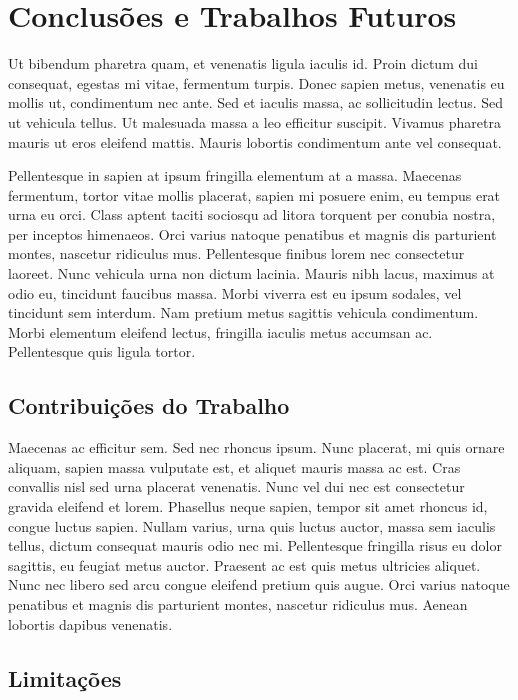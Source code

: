 \chapter{Conclusões e Trabalhos Futuros}
\label{chap:conclusoes-e-trabalhos-futuros}

Ut bibendum pharetra quam, et venenatis ligula iaculis id. Proin dictum dui consequat, egestas mi vitae, fermentum turpis. Donec sapien metus, venenatis eu mollis ut, condimentum nec ante. Sed et iaculis massa, ac sollicitudin lectus. Sed ut vehicula tellus. Ut malesuada massa a leo efficitur suscipit. Vivamus pharetra mauris ut eros eleifend mattis. Mauris lobortis condimentum ante vel consequat.

Pellentesque in sapien at ipsum fringilla elementum at a massa. Maecenas fermentum, tortor vitae mollis placerat, sapien mi posuere enim, eu tempus erat urna eu orci. Class aptent taciti sociosqu ad litora torquent per conubia nostra, per inceptos himenaeos. Orci varius natoque penatibus et magnis dis parturient montes, nascetur ridiculus mus. Pellentesque finibus lorem nec consectetur laoreet. Nunc vehicula urna non dictum lacinia. Mauris nibh lacus, maximus at odio eu, tincidunt faucibus massa. Morbi viverra est eu ipsum sodales, vel tincidunt sem interdum. Nam pretium metus sagittis vehicula condimentum. Morbi elementum eleifend lectus, fringilla iaculis metus accumsan ac. Pellentesque quis ligula tortor.

\section{Contribuições do Trabalho}
\label{sec:contribuicoes-do-trabalho}

Maecenas ac efficitur sem. Sed nec rhoncus ipsum. Nunc placerat, mi quis ornare aliquam, sapien massa vulputate est, et aliquet mauris massa ac est. Cras convallis nisl sed urna placerat venenatis. Nunc vel dui nec est consectetur gravida eleifend et lorem. Phasellus neque sapien, tempor sit amet rhoncus id, congue luctus sapien. Nullam varius, urna quis luctus auctor, massa sem iaculis tellus, dictum consequat mauris odio nec mi. Pellentesque fringilla risus eu dolor sagittis, eu feugiat metus auctor. Praesent ac est quis metus ultricies aliquet. Nunc nec libero sed arcu congue eleifend pretium quis augue. Orci varius natoque penatibus et magnis dis parturient montes, nascetur ridiculus mus. Aenean lobortis dapibus venenatis.

\section{Limitações}
\label{sec:limitacoes}

